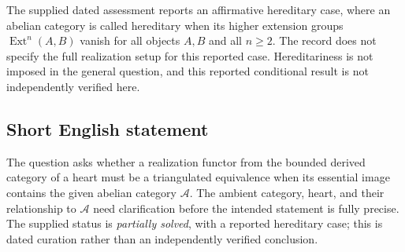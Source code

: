 \documentclass[11pt]{article}
\begin{document}
The supplied dated assessment reports an affirmative hereditary case, where an abelian category is called hereditary when its higher extension groups \(\operatorname{Ext}^n(A,B)\) vanish for all objects \(A,B\) and all \(n\geq 2\). The record does not specify the full realization setup for this reported case. Hereditariness is not imposed in the general question, and this reported conditional result is not independently verified here.
\subsection{Short English statement}
The question asks whether a realization functor from the bounded derived category of a heart must be a triangulated equivalence when its essential image contains the given abelian category \(\mathcal A\). The ambient category, heart, and their relationship to \(\mathcal A\) need clarification before the intended statement is fully precise. The supplied status is \emph{partially solved}, with a reported hereditary case; this is dated curation rather than an independently verified conclusion.
\end{document}
